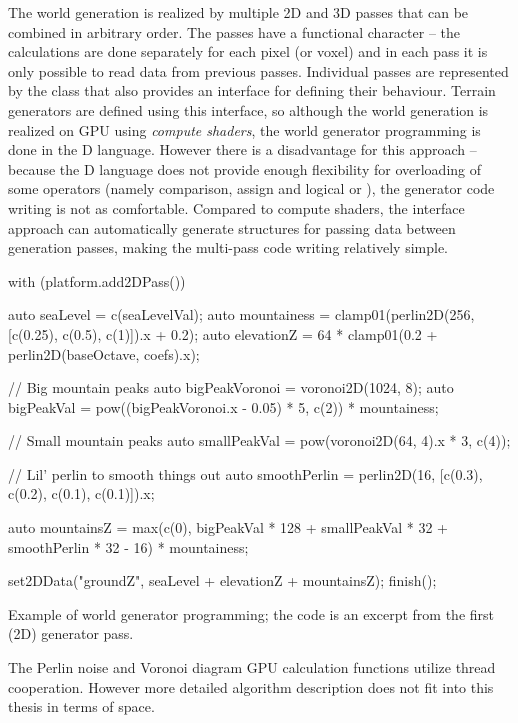 The world generation is realized by multiple 2D and 3D passes that can be combined in arbitrary order. The passes have a functional character -- the calculations are done separately for each pixel (or voxel) and in each pass it is only possible to read data from previous passes. Individual passes are represented by the class  that also provides an interface for defining their behaviour. Terrain generators are defined using this interface, so although the world generation is realized on GPU using \textit{compute shaders}, the world generator programming is done in the D language. However there is a disadvantage for this approach -- because the D language does not provide enough flexibility for overloading of some operators (namely comparison, assign and logical \inlineDCode{&&} or \inlineDCode{||}), the generator code writing is not as comfortable. Compared to compute shaders, the interface approach can automatically generate structures for passing data between generation passes, making the multi-pass code writing relatively simple.

\begin{codeFloat}[H]
	\begin{dcode}
with (platform.add2DPass()) {
	auto seaLevel = c(seaLevelVal);
	auto mountainess = clamp01(perlin2D(256, [c(0.25), c(0.5), c(1)]).x + 0.2);
	auto elevationZ = 64 * clamp01(0.2 + perlin2D(baseOctave, coefs).x);

	// Big mountain peaks
	auto bigPeakVoronoi = voronoi2D(1024, 8);
	auto bigPeakVal = pow((bigPeakVoronoi.x - 0.05) * 5, c(2)) * mountainess;
	
	// Small mountain peaks
	auto smallPeakVal = pow(voronoi2D(64, 4).x * 3, c(4));
	
	// Lil' perlin to smooth things out
	auto smoothPerlin = perlin2D(16, [c(0.3), c(0.2), c(0.1), c(0.1)]).x;
	
	auto mountainsZ = max(c(0), bigPeakVal * 128 + smallPeakVal * 32 + smoothPerlin * 32 - 16) * mountainess;

	set2DData("groundZ", seaLevel + elevationZ + mountainsZ);
	finish();
}
	\end{dcode}
	\caption{Example of world generator programming; the code is an excerpt from the first (2D)  generator pass.}
\end{codeFloat}

The Perlin noise and Voronoi diagram GPU calculation functions utilize thread cooperation. However more detailed algorithm description does not fit into this thesis in terms of space.

